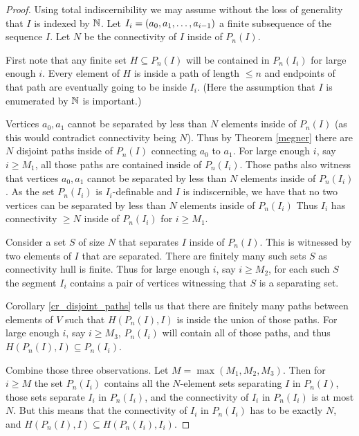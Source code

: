 \begin{proof}
  Using total indiscernibility we may assume without the loss of generality that $I$ is indexed by $\mathbb{N}$.
  Let $I_i = \left(a_0, a_1, \ldots, a_{i-1}\right)$ a finite subsequence of the sequence $I$.
  Let $N$ be the connectivity of $I$ inside of $P_n(I)$.

  First note that any finite set $H \subseteq P_n(I)$ will be contained in $P_n(I_i)$ for large enough $i$.
  Every element of $H$ is inside a path of length $\leq n$ and endpoints of that path are eventually going to be inside $I_i$.
  (Here the assumption that $I$ is enumerated by $\mathbb{N}$ is important.)

  Vertices $a_0, a_1$ cannot be separated by less than $N$ elements inside of $P_n(I)$
  (as this would contradict connectivity being $N$).
  Thus by Theorem \ref{megner} there are $N$ disjoint paths inside of $P_n(I)$ connecting $a_0$ to $a_1$.
  For large enough $i$, say $i \geq M_1$, all those paths are contained inside of $P_n(I_i)$.
  Those paths also witness that vertices $a_0, a_1$ cannot be separated by less than $N$ elements inside of $P_n(I_i)$.
  As the set $P_n(I_i)$ is $I_i$-definable and $I$ is indiscernible,
  we have that no two vertices can be separated by less than $N$ elements inside of $P_n(I_i)$
  Thus $I_i$ has connectivity $\geq N$ inside of $P_n(I_i)$ for $i \geq M_1$.

  Consider a set $S$ of size $N$ that separates $I$ inside of $P_n(I)$.
  This is witnessed by two elements of $I$ that are separated.
  There are finitely many such sets $S$ as connectivity hull is finite.
  Thus for large enough $i$, say $i \geq M_2$, for each such $S$
  the segment $I_i$ contains a pair of vertices witnessing that $S$ is a separating set.

  Corollary \ref{cr_disjoint_paths} tells us that there are finitely many paths between elements of $V$ such that
  $H(P_n(I), I)$ is inside the union of those paths.
  For large enough $i$, say $i \geq M_3$, $P_n(I_i)$ will contain all of those paths, and thus $H(P_n(I), I) \subseteq P_n(I_i)$.

  Combine those three observations.
  Let $M = \max(M_1, M_2, M_3)$.
  Then for $i \geq M$ the set $P_n(I_i)$ contains all the $N$-element sets separating $I$ in $P_n(I)$,
  those sets separate $I_i$ in $P_n(I_i)$,
  and the connectivity of $I_i$ in $P_n(I_i)$ is at most $N$.
  But this means that the connectivity of $I_i$ in $P_n(I_i)$ has to be exactly $N$, and $H(P_n(I), I) \subseteq H(P_n(I_i), I_i)$.


\end{proof}
